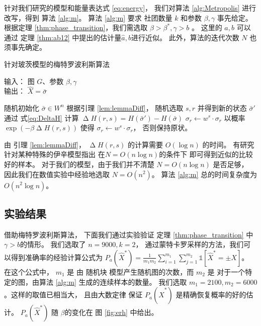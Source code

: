 针对我们研究的模型和能量表达式 \eqref{eq:energy}，
我们对算法 \ref{alg:Metropolis} 进行
改写，得到
算法 \ref{alg:m}。
算法 \ref{alg:m} 要求
社团数量 $k$ 和参数 $\beta, \gamma$ 事先给定。
根据定理 \ref{thm:phase_transition}，我们需选取  $\beta>\beta^*, \gamma > b$
。
这里的 $a, b$
可以通过 定理 \ref{thm:ab12} 中提出的估计量$\hat{a},\hat{b}$进行近似。
此外，算法的迭代次数  $N$
也须事先确定。
\begin{algorithm}[H]
	\caption{针对玻茨模型的梅特罗波利斯算法} \label{alg:m}
	输入： 图 $G$、参数 $\beta,\gamma$ \\
	输出： $\hat{X} = \bar{\sigma}$
	\begin{algorithmic}[1]
		\STATE 随机初始化 $\bar{\sigma} \in W^n$ %
		\STATE 根据引理 \ref{lem:lemmaDiff}，
		随机选取 $s, r$ 并得到新的状态
		 $\bar{\sigma}'$
		\STATE 通过 式\eqref{eq:DeltaH} 计算 $\upDelta H(r,s) = H(\bar{\sigma}') - H(\bar{\sigma})$ %
		\STATE $\sigma_r \gets w^s \cdot \sigma_r$ %
		\ELSE
		\STATE 以概率 $\exp(-\beta \upDelta H(r,s))$ 使得
			$\sigma_r \leftarrow w^s \cdot \sigma_r$，
			否则保持原状。 %
		\ENDIF %
		\ENDFOR
	\end{algorithmic}
\end{algorithm}
 由 引理 \ref{lem:lemmaDiff}， $\upDelta H(r,s)$ 的计算需要 $O(\log n)$ 的时间。
有研究针对某种特殊的伊辛模型指出
在$N=O(n\log n)$的条件下 即可得到近似的比较好的样本\cite{mcmc}。
对于我们的模型，由于我们并不清楚 $ N = O(n\log n)$ 是否足够，
因此我们在数值实验中经验地选取 $N=O\left(n^2\right)$。
算法 \ref{alg:m} 总的时间复杂度为 $O\left(n^2 \log n \right)$。


\subsection{实验结果}
借助梅特罗波利斯算法，
下面我们通过实验验证 定理 \ref{thm:phase_transition} 中  $\gamma > b$的情形。
我们选取了 $n=9000, k=2$，
通过蒙特卡罗采样的方法，我们可以得到准确率的经验计算公式为
$P_a(\hat{X}^*) = \frac{1}{m_1m_2}\sum_{i=1}^{m_1} \sum_{j=1}^{m_2} \mathds{1}[\hat{X}^* = \pm X]$。
在这个公式中，
$m_1$ 是 由 随机块 模型产生随机图的次数，而
$m_2$ 是 对于一个特定的图，由算法 \ref{alg:m} 生成的连续样本的数量。
我们选取 $m_1=2100,m_2=6000$。这样的取值已相当大，
且由大数定律
保证 $P_a(\hat{X}^*)$ 是精确恢复概率的好的估计。
$P_a(\hat{X}^*)$ 随 $\beta$的变化在
图 \ref{fig:erh} 中给出。

